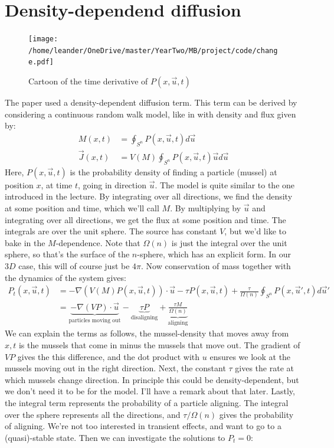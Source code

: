 \documentclass[a4paper]{jpconf}
\begin{document}
\section{Density-dependend diffusion}
\begin{figure}[h!]
    \centering
    \texttt{[image: /home/leander/OneDrive/master/YearTwo/MB/project/code/change.pdf]}
    \caption{Cartoon of the time derivative of $P(x,\vec u,t)$}
\end{figure}
The paper used a density-dependent diffusion term. This term can be derived by considering a continuous random walk model, like in \cite{PhysRevE.48.2553} with density and flux given by:
\[\begin{aligned}
M(x,t) &= \oint_{S^n} P(x,\vec u,t)d\vec u\\
\vec J(x,t) &=V(M) \oint_{S^n} P(x,\vec u,t)\vec ud\vec u
\end{aligned}\]
Here, $P(x,\vec u,t)$ is the probability density of finding a particle (mussel) at position $x$, at time $t$, going in direction $\vec u$. The model is quite similar to the one introduced in the lecture. By integrating over all directions, we find the density at some position and time, which we'll call $M$. By multiplying by $\vec u$ and integrating over all directions, we get the flux at some position and time. The integrals are over the unit sphere. The source \cite{PhysRevE.48.2553} has constant $V$, but we'd like to bake in the $M$-dependence. Note that $\Omega(n)$ is just the integral over the unit sphere, so that's the surface of the $n$-sphere, which has an explicit form. In our $3D$ case, this will of course just be $4\pi$. Now conservation of mass together with the dynamics of the system gives:
\[\begin{aligned}
P_t(x,\vec u,t) &= -\nabla(V(M)P(x,\vec u,t))\cdot \vec u -\tau P(x,\vec u,t)+\frac{\tau }{\Omega(n)}\oint_{S^n}P(x,\vec u',t)d\vec u'\\
&=\underbrace{-\nabla(VP)\cdot \vec u}_{\text{particles moving out}}-\underbrace{\tau P}_{\text{disaligning}}+\underbrace{\frac{\tau M}{\Omega(n)}}_{\text{aligning}}
\end{aligned}\]
We can explain the terms as follows, the mussel-density that moves away from $x,t$ is the mussels that come in minus the mussels that move out. The gradient of $VP$ gives the this difference, and the dot product with $u$ ensures we look at the mussels moving out in the right direction. Next, the constant $\tau$ gives the rate at which mussels change direction. In principle this could be density-dependent, but we don't need it to be for the model. I'll have a remark about that later. Lastly, the integral term represents the probability of a particle aligning. The integral over the sphere represents all the directions, and $\tau/\Omega(n)$ gives the probability of aligning. We're not too interested in transient effects, and want to go to a (quasi)-stable state. Then we can investigate the solutions to $P_t=0$:
\end{document}
